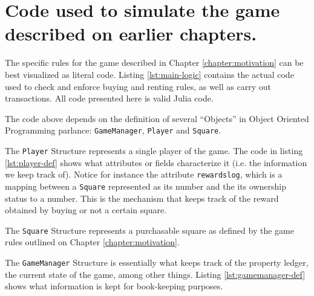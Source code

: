 \label{appendix:miniopoly-simulation}

\section*{Code used to simulate the game described on earlier 
chapters.}

The specific rules for the game described in Chapter 
\ref{chapter:motivation} can be best visualized as literal 
code. Listing \ref{lst:main-logic} contains the actual code 
used to check and enforce buying and renting rules, as well as 
carry out transactions. All code presented here is valid Julia 
code.



The code above depends on the definition of several ``Objects'' 
in Object Oriented Programming parlance: 
\lstinline{GameManager}, \lstinline{Player} and 
\lstinline{Square}.

The \lstinline{Player} Structure represents a single player of 
the game. The code in listing \ref{lst:player-def} shows what 
attributes or fields characterize it (i.e. the information we 
keep track of). Notice for instance the attribute 
\lstinline{rewardslog}, which is a mapping between a 
\lstinline{Square} represented as its number and the its 
ownership status to a number. This is the mechanism that keeps 
track of the reward obtained by buying or not a certain square.



The \lstinline{Square} Structure represents a purchasable 
square as defined by the game rules outlined on Chapter 
\ref{chapter:motivation}. 



The \lstinline{GameManager} Structure is essentially what keeps 
track of the property ledger, the current state of the game, 
among other things. Listing \ref{lst:gamemanager-def} shows 
what information is kept for book-keeping purposes.


